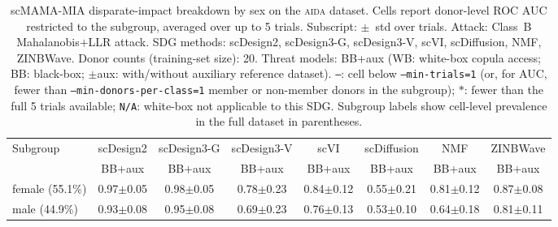 \begin{table}[ht]
\centering
\small
\caption{scMAMA-MIA disparate-impact breakdown by sex on the \textsc{aida} dataset. Cells report donor-level ROC AUC restricted to the subgroup, averaged over up to 5 trials. Subscript: $\pm$~std over trials. Attack: Class~B Mahalanobis$+$LLR attack. SDG methods: scDesign2, scDesign3-G, scDesign3-V, scVI, scDiffusion, NMF, ZINBWave. Donor counts (training-set size): 20. Threat models: BB+aux (WB: white-box copula access; BB: black-box; $\pm$aux: with/without auxiliary reference dataset). \texttt{---}: cell below \texttt{--min-trials=1} (or, for AUC, fewer than \texttt{--min-donors-per-class=1} member or non-member donors in the subgroup); $*$: fewer than the full 5 trials available; \texttt{N/A}: white-box not applicable to this SDG. Subgroup labels show cell-level prevalence in the full dataset in parentheses.}
\label{tab:subgroup_aida_sex_classb_sd2-sd3g-sd3v-scvi-scdiff-nmf-zinbwave_20d_100_auc}
\begin{tabular}{lccccccc}
\toprule
Subgroup & \multicolumn{1}{c|}{scDesign2} & \multicolumn{1}{c|}{scDesign3-G} & \multicolumn{1}{c|}{scDesign3-V} & \multicolumn{1}{c|}{scVI} & \multicolumn{1}{c|}{scDiffusion} & \multicolumn{1}{c|}{NMF} & \multicolumn{1}{c}{ZINBWave} \\
 & BB+aux & BB+aux & BB+aux & BB+aux & BB+aux & BB+aux & BB+aux \\
\midrule
female (55.1\%) & 0.97{\scriptsize$\pm$0.05} & 0.98{\scriptsize$\pm$0.05} & 0.78{\scriptsize$\pm$0.23} & 0.84{\scriptsize$\pm$0.12} & 0.55{\scriptsize$\pm$0.21} & 0.81{\scriptsize$\pm$0.12} & 0.87{\scriptsize$\pm$0.08} \\
male (44.9\%) & 0.93{\scriptsize$\pm$0.08} & 0.95{\scriptsize$\pm$0.08} & 0.69{\scriptsize$\pm$0.23} & 0.76{\scriptsize$\pm$0.13} & 0.53{\scriptsize$\pm$0.10} & 0.64{\scriptsize$\pm$0.18} & 0.81{\scriptsize$\pm$0.11} \\
\bottomrule
\end{tabular}
\end{table}

